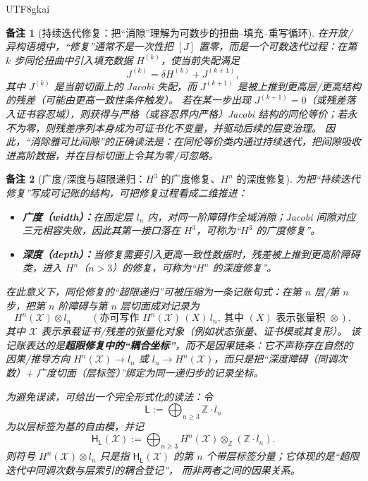 \documentclass[12pt]{article}
\newtheorem{remark}{备注}[section]
\begin{document}
\begin{CJK*}{UTF8}{gkai}
\begin{remark}[持续迭代修复：把“消隙”理解为可数步的扭曲--填充--重写循环]\label{rem:iterative-repair-jacobi}
在开放/异构语境中，“修复”通常不是一次性把 $[J]$ 置零，而是一个可数迭代过程：在第 $k$ 步同伦扭曲中引入填充数据 $H^{(k)}$，使当前失配满足
\[
  J^{(k)}=\delta H^{(k)}+J^{(k+1)},
\]
其中 $J^{(k)}$ 是当前切面上的 Jacobi 失配，而 $J^{(k+1)}$ 是被上推到更高层/更高结构的残差（可能由更高一致性条件触发）。
若在某一步出现 $J^{(k+1)}=0$（或残差落入证书容忍域），则获得与严格（或容忍界内严格）Jacobi 结构的同伦等价；若永不为零，则残差序列本身成为可证书化不变量，并驱动后续的层变治理。
因此，“消除雅可比间隙”的正确读法是：在同伦等价类内通过持续迭代，把间隙吸收进高阶数据，并在目标切面上令其为零/可忽略。
\end{remark}

\begin{remark}[广度/深度与超限递归：$H^3$ 的广度修复、$H^n$ 的深度修复]\label{rem:breadth-depth-hn-ln}
为把“持续迭代修复”写成可记账的结构，可把修复过程看成二维推进：
\begin{itemize}
  \item \textbf{广度（width）：}在固定层 $l_n$ 内，对同一阶障碍作全域消隙；Jacobi 间隙对应三元相容失败，因此其第一接口落在 $H^3$，可称为“$H^3$ 的广度修复”。
  \item \textbf{深度（depth）：}当修复需要引入更高一致性数据时，残差被上推到更高阶障碍类，进入 $H^n$（$n>3$）的修复，可称为“$H^n$ 的深度修复”。
\end{itemize}
在此意义下，同伦修复的“超限递归”可被压缩为一条记账句式：在第 $n$ 层/第 $n$ 步，把\emph{第 $n$ 阶障碍}与\emph{第 $n$ 层切面}成对记录为
\[
  H^n(\mathcal X)\otimes l_n
  \qquad(\text{亦可写作 }H^n(\mathcal X)\,(X)\,l_n,\ \text{其中 }(X)\text{ 表示张量积 } \otimes),
\]
其中 $\mathcal X$ 表示承载证书/残差的张量化对象（例如状态张量、证书模或其复形）。
该记账表达的是\textbf{超限修复中的“耦合坐标”}，而不是因果链条：它不声称存在自然的因果/推导方向
$H^n(\mathcal X)\to l_n$ 或 $l_n\to H^n(\mathcal X)$，而只是把“深度障碍（同调次数）+ 广度切面（层标签）”绑定为同一递归步的记录坐标。

为避免误读，可给出一个完全形式化的读法：令
\[
  \mathsf{L}:=\bigoplus_{n\ge3}\mathbb Z\cdot l_n
\]
为以层标签为基的自由模，并记
\[
  \mathsf{H}_{\mathsf{L}}(\mathcal X):=\bigoplus_{n\ge3} H^n(\mathcal X)\otimes_{\mathbb Z}(\mathbb Z\cdot l_n).
\]
则符号 $H^n(\mathcal X)\otimes l_n$ 只是指 $\mathsf{H}_{\mathsf{L}}(\mathcal X)$ 的第 $n$ 个带层标签分量；它体现的是“超限迭代中同调次数与层索引的耦合登记”，
  而非两者之间的因果关系。
\end{remark}


\end{CJK*}
\end{document}
